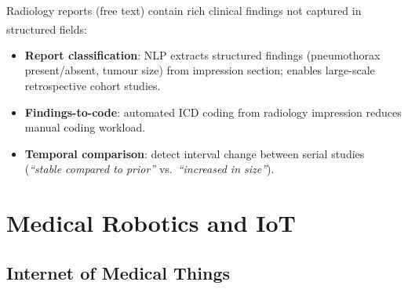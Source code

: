 \begin{tcbitemize}[ skin=sectionraster ]
    \tcbitem[title={NLP in Radiology Reports}, raster multicolumn=3]
    Radiology reports (free text) contain rich clinical findings not captured in structured fields\textsuperscript{\cite[][p.~639]{sorinDeepLearningNLP2020}}:
    \begin{itemize}
        \item \textbf{Report classification}: NLP extracts structured findings (pneumothorax present/absent, tumour size) from impression section; enables large-scale retrospective cohort studies.
        \item \textbf{Findings-to-code}: automated ICD coding from radiology impression reduces manual coding workload.
        \item \textbf{Temporal comparison}: detect interval change between serial studies (\textit{``stable compared to prior''} vs.\ \textit{``increased in size''}).
    \end{itemize}
\end{tcbitemize}

\section{Medical Robotics and IoT}

\subsection{Internet of Medical Things}


